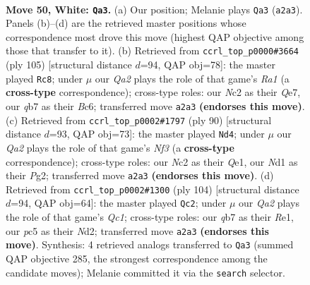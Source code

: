 \documentclass[11pt]{article}
\begin{document}
\clearpage

\begin{figure}[p]\centering
\begin{subfigure}{0.46\textwidth}\centering
\resizebox{\linewidth}{!}{%
\newchessgame
\chessboard[
  setfen={nr4k1/1q6/p2bnr2/P1p2p1p/3p1Pp1/1P4P1/QRNBP2P/2RN2K1 w - - 16 50},
  showmover=false,
  pgfstyle=straightmove, color=movearrow, markmove={a2-a3}
]}
\caption{}
\end{subfigure}\hfill
\begin{subfigure}{0.46\textwidth}\centering
\resizebox{\linewidth}{!}{%
\newchessgame
\chessboard[
  setfen={r5k1/3rqp2/1pbpn1p1/7p/1PP1Pp1P/1B1R1N2/3Q1PP1/4R1K1 b - - 36 53},
  showmover=false,
  pgfstyle=straightmove, color=movearrow, markmove={a8-c8}
]}
\caption{}
\end{subfigure}
\\[4pt]
\begin{subfigure}{0.46\textwidth}\centering
\resizebox{\linewidth}{!}{%
\newchessgame
\chessboard[
  setfen={1r2r1k1/p2b1n2/P1p2qp1/2Pp1p1p/1p3P2/1P1BPN1P/4R1P1/2R1Q2K w - - 21 46},
  showmover=false,
  pgfstyle=straightmove, color=movearrow, markmove={f3-d4}
]}
\caption{}
\end{subfigure}\hfill
\begin{subfigure}{0.46\textwidth}\centering
\resizebox{\linewidth}{!}{%
\newchessgame
\chessboard[
  setfen={3r2k1/5n2/2q1r1pp/1pp1pp2/p1P5/P2P3P/1P1N1PP1/2QRR1K1 w - - 1 53},
  showmover=false,
  pgfstyle=straightmove, color=movearrow, markmove={c1-c2}
]}
\caption{}
\end{subfigure}
\caption{\textbf{Move 50, White: \texttt{Qa3}.} (a) Our position; Melanie plays \texttt{Qa3} (\texttt{a2a3}). Panels (b)--(d) are the retrieved master positions whose correspondence most drove this move (highest QAP objective among those that transfer to it). (b) Retrieved from \texttt{ccrl\_top\_p0000\#3664} (ply 105) [structural distance $d$=94, QAP obj=78]: the master played \texttt{Rc8}; under $\mu$ our \emph{Qa2} plays the role of that game's \emph{Ra1} (a \textbf{cross-type} correspondence); cross-type roles: our \emph{N}c2 as their \emph{Q}e7, our \emph{q}b7 as their \emph{B}c6; transferred move \texttt{a2a3} \textbf{(endorses this move)}. (c) Retrieved from \texttt{ccrl\_top\_p0002\#1797} (ply 90) [structural distance $d$=93, QAP obj=73]: the master played \texttt{Nd4}; under $\mu$ our \emph{Qa2} plays the role of that game's \emph{Nf3} (a \textbf{cross-type} correspondence); cross-type roles: our \emph{N}c2 as their \emph{Q}e1, our \emph{N}d1 as their \emph{P}g2; transferred move \texttt{a2a3} \textbf{(endorses this move)}. (d) Retrieved from \texttt{ccrl\_top\_p0002\#1300} (ply 104) [structural distance $d$=94, QAP obj=64]: the master played \texttt{Qc2}; under $\mu$ our \emph{Qa2} plays the role of that game's \emph{Qc1}; cross-type roles: our \emph{q}b7 as their \emph{R}e1, our \emph{p}c5 as their \emph{N}d2; transferred move \texttt{a2a3} \textbf{(endorses this move)}. Synthesis: 4 retrieved analogs transferred to \texttt{Qa3} (summed QAP objective 285, the strongest correspondence among the candidate moves); Melanie committed it via the \texttt{search} selector.}
\label{fig:thought-m98}
\end{figure}
\end{document}
